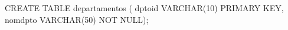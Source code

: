 \lstset{caption=Crear tabla ``departamentos'',label=sql:crearTablaDepartamentos}
\begin{SQL}
CREATE TABLE departamentos (
dptoid VARCHAR(10) PRIMARY KEY,
nomdpto VARCHAR(50) NOT NULL);
\end{SQL}
